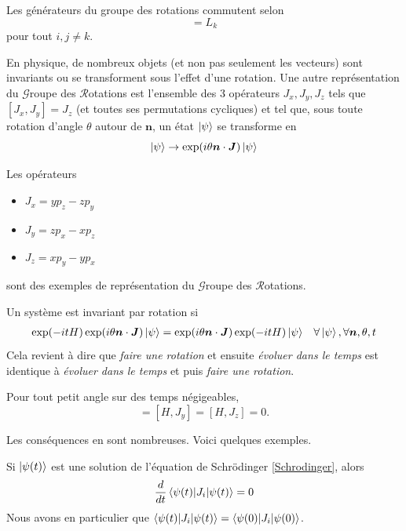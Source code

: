 \documentclass[../notesdecours.tex]{subfiles}
\begin{document}
\begin{Property}
    Les générateurs du groupe des rotations commutent selon
    \begin{equation}
        [L_i,L_j] = L_k
    \end{equation}
    pour tout $i,j \neq k$. 
\end{Property}

En physique, de nombreux objets (et non pas seulement les vecteurs) sont invariants ou se transforment sous l'effet d'une rotation. Une autre représentation du $\mathcal{G}$roupe des $\mathcal{R}$otations est l'ensemble des 3 opérateurs $J_x,J_y,J_z$ tels que $[J_x,J_y] = J_z$ (et toutes ses permutations cycliques) et tel que, sous toute rotation d'angle $\theta$ autour de $\bm{n}$, un état $\ket{\psi}$ se transforme en
\begin{equation}
\ket{\psi} \rightarrow \exp(i\theta\bm{n}\cdot\bm{J})\ket{\psi}
\end{equation}

\begin{exemple}Les opérateurs
\begin{itemize}
\item $J_x = yp_z - zp_y$
\item $J_y = zp_x - xp_z$
\item $J_z = xp_y - yp_x$
\end{itemize}
sont des exemples de représentation du $\mathcal{G}$roupe des $\mathcal{R}$otations.
\end{exemple}
Un système est invariant par rotation si
\begin{align}
\exp (-itH) \exp (i\theta \bm{n}\cdot\bm{J})\ket{\psi} &= \exp (i\theta \bm{n}\cdot\bm{J})\exp (-itH) \ket{\psi}			&\forall \ket{\psi},\forall \bm{n},\theta,t
\end{align}
Cela revient à dire que \emph{faire une rotation} et ensuite \emph{évoluer dans le temps} est identique à \emph{évoluer dans le temps} et puis \emph{faire une rotation}.

\begin{Property} 
    Pour tout petit angle sur des temps négigeables,  
    \begin{equation}
        [H,J_x] = [H,J_y] = [H,J_z] = 0.
    \end{equation}
\end{Property}
Les conséquences en sont nombreuses. Voici quelques exemples.
\begin{Property}
    Si $\ket{\psi(t)}$ est une solution de l'équation de Schrödinger \eqref{Schrodinger}, alors 
    \begin{equation}
        \frac{d}{dt}\braket{\psi(t)|J_i|\psi(t)} = 0
    \end{equation}
    Nous avons en particulier que $\braket{\psi(t)|J_i|\psi(t)} = \braket{\psi(0)|J_i|\psi(0)}$.
\end{Property}
\end{document}
